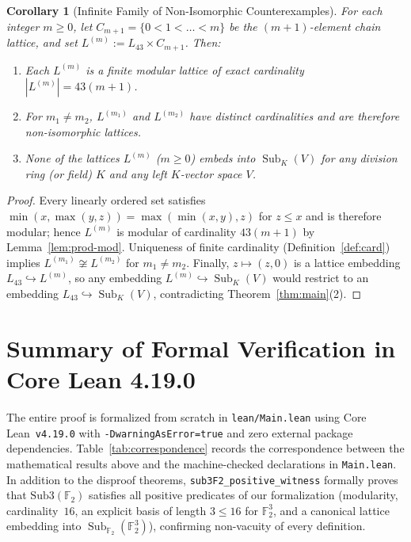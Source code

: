 \documentclass[11pt]{article}
\newtheorem{corollary}[theorem]{Corollary}
\theoremstyle{definition}
\newcommand{\Sub}{\operatorname{Sub}}
\newcommand{\FF}{\mathbb{F}}
\begin{document}
\begin{corollary}[Infinite Family of Non-Isomorphic Counterexamples]\label{cor:family}
For each integer $m \ge 0$, let $C_{m+1} = \{0 < 1 < \dots < m\}$ be the $(m+1)$-element
chain lattice, and set $L^{(m)} := L_{43} \times C_{m+1}$. Then:
\begin{enumerate}
  \item[\textup{(1)}] Each $L^{(m)}$ is a finite modular lattice of exact cardinality
  $|L^{(m)}| = 43(m + 1)$.
  \item[\textup{(2)}] For $m_1 \ne m_2$, $L^{(m_1)}$ and $L^{(m_2)}$ have distinct
  cardinalities and are therefore non-isomorphic lattices.
  \item[\textup{(3)}] None of the lattices $L^{(m)}$ ($m \ge 0$) embeds into $\Sub_K(V)$
  for any division ring (or field) $K$ and any left $K$-vector space $V$.
\end{enumerate}
\end{corollary}
\begin{proof}
Every linearly ordered set satisfies $\min(x, \max(y, z)) = \max(\min(x, y), z)$ for
$z \le x$ and is therefore modular; hence $L^{(m)}$ is modular of cardinality
$43(m+1)$ by Lemma~\ref{lem:prod-mod}. Uniqueness of finite cardinality
(Definition~\ref{def:card}) implies $L^{(m_1)} \not\cong L^{(m_2)}$ for $m_1 \ne m_2$.
Finally, $z \mapsto (z, 0)$ is a lattice embedding $L_{43} \hookrightarrow L^{(m)}$, so
any embedding $L^{(m)} \hookrightarrow \Sub_K(V)$ would restrict to an embedding
$L_{43} \hookrightarrow \Sub_K(V)$, contradicting Theorem~\ref{thm:main}(2).
\end{proof}

\section{Summary of Formal Verification in Core Lean 4.19.0}

The entire proof is formalized from scratch in \texttt{lean/Main.lean} using Core
Lean~\texttt{v4.19.0} with \texttt{-DwarningAsError=true} and zero external package
dependencies. Table~\ref{tab:correspondence} records the correspondence between the
mathematical results above and the machine-checked declarations in \texttt{Main.lean}.
In addition to the disproof theorems, \texttt{sub3F2\_positive\_witness} formally proves
that $\mathrm{Sub3}(\FF_2)$ satisfies all positive predicates of our formalization
(modularity, cardinality~$16$, an explicit basis of length $3 \le 16$ for $\FF_2^3$, and a
canonical lattice embedding into $\Sub_{\FF_2}(\FF_2^3)$), confirming non-vacuity of every
definition.
\end{document}
